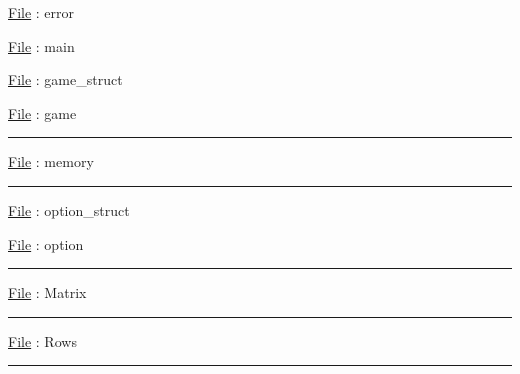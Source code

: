 \documentclass[8pt,a4paper]{article}
\begin{document}
\underline{File} : error


\underline{File} : main


\underline{File} : game\_struct

\underline{File} : game

\vspace{-0.35cm}\noindent\rule{8cm}{0.4pt}


\underline{File} : memory

\vspace{-0.35cm}\noindent\rule{8cm}{0.4pt}



\underline{File} : option\_struct

\underline{File} : option

\vspace{-0.35cm}\noindent\rule{8cm}{0.4pt}


\underline{File} : Matrix

\vspace{-0.35cm}\noindent\rule{8cm}{0.4pt}


\underline{File} : Rows

\vspace{-0.35cm}\noindent\rule{8cm}{0.4pt}

\end{document}
